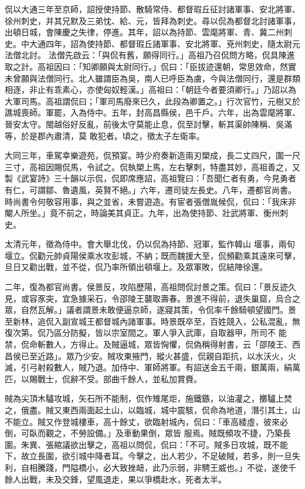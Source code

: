 \begin{pinyinscope}
 侃以大通三年至京師，詔授使持節、散騎常侍、都督瑕丘征討諸軍事、安北將軍、徐州刺史，并其兄默及三弟忱、給、元，皆拜為刺史。尋以侃為都督北討諸軍事，出頓日城，會陳慶之失律，停進。其年，詔以為持節、雲麾將軍、青、冀二州刺史。中大通四年，詔為使持節、都督瑕丘諸軍事、安北將軍、兗州刺史，隨太尉元法僧北討。
 法僧先啟云：「與侃有舊，願得同行。」高祖乃召侃問方略，侃具陳進取之計。高祖因曰：「知卿願與太尉同行。」侃曰：「臣拔迹還朝，常思效命，然實未曾願與法僧同行。北人雖謂臣為吳，南人已呼臣為虜，今與法僧同行，還是群類相逐，非止有乖素心，亦使匈奴輕漢。」高祖曰：「朝廷今者要須卿行。」乃詔以為大軍司馬。高祖謂侃曰；「軍司馬廢來已久，此段為卿置之。」行次官竹，元樹又於譙城喪師。軍罷，入為侍中。五年，封高昌縣侯，邑千戶。六年，出為雲麾將軍、晉安太守。閩越俗好反亂，前後太守莫能止息，侃至討擊，斬其渠帥陳稱、吳滿等，於是郡內肅清，莫
 敢犯者。頃之，徵太子左衛率。



 大同三年，車駕幸樂遊苑，侃預宴。時少府奏新造兩刃槊成，長二丈四尺，圍一尺三寸，高祖因賜侃馬，令試之。侃執槊上馬，左右擊刺，特盡其妙，高祖善之，又製《武宴詩》三十韻以示侃，侃即席應詔，高祖覽曰：「吾聞仁者有勇，今見勇者有仁，可謂鄒、魯遺風，英賢不絕。」六年，遷司徒左長史。八年，遷都官尚書。時尚書令何敬容用事，與之並省，未嘗遊造。有宦者張僧胤候侃，侃曰：「我床非閹人所坐。」竟不前之，時論美其貞正。九年，出為使持節、壯武將軍、衡州刺史。



 太清元年，徵為侍中。會大舉北伐，仍以侃為持節、冠軍，監作韓山
 堰事，兩旬堰立。侃勸元帥貞陽侯乘水攻彭城，不納；既而魏援大至，侃頻勸乘其遠來可擊，旦日又勸出戰，並不從，侃乃率所領出頓堰上。及眾軍敗，侃結陣徐還。



 二年，復為都官尚書。侯景反，攻陷歷陽，高祖問侃討景之策。侃曰：「景反迹久見，或容豕突，宜急據采石，令邵陵王襲取壽春。景進不得前，退失巢窟，烏合之眾，自然瓦解。」議者謂景未敢便逼京師，遂寢其策，令侃率千餘騎頓望國門。景至新林，追侃入副宣城王都督城內諸軍事。時景既卒至，百姓競入，公私混亂，無復次第。侃乃區分防擬，皆以宗室間之。軍人爭入武庫，自取器甲，所司不
 能禁，侃命斬數人，方得止。及賊逼城，眾皆恟懼，侃偽稱得射書，云「邵陵王、西昌侯已至近路」。眾乃少安。賊攻東掖門，縱火甚盛，侃親自距抗，以水沃火，火滅，引弓射殺數人，賊乃退。加侍中、軍師將軍。有詔送金五千兩，銀萬兩，絹萬匹，以賜戰士，侃辭不受。部曲千餘人，並私加賞賚。



 賊為尖頂木驢攻城，矢石所不能制，侃作雉尾炬，施鐵鏃，以油灌之，擲驢上焚之，俄盡。賊又東西兩面起土山，以臨城，城中震駭，侃命為地道，潛引其土，山不能立。賊又作登城樓車，高十餘丈，欲臨射城內，侃曰：「車高緌虛，彼來必倒，可臥而觀之，不勞設備。」及車動果倒，眾皆
 服焉。賊既頻攻不捷，乃築長圍。朱異、張綰議欲出擊之，高祖以問侃，侃曰：「不可。賊多日攻城，既不能下，故立長圍，欲引城中降者耳。今擊之，出人若少，不足破賊，若多，則一旦失利，自相騰踐，門隘橋小，必大致挫衄，此乃示弱，非騁王威也。」不從，遂使千餘人出戰，未及交鋒，望風退走，果以爭橋赴水，死者太半。




\end{pinyinscope}
